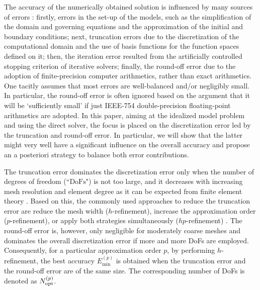 \documentclass[final,3p]{elsarticle}
\begin{document}
The accuracy of the numerically obtained solution is influenced by many sources of errors \citep{ferziger2012computational}: firstly, errors in the set-up of the models, such as the simplification of the domain and governing equations and the approximation of the initial and boundary conditions; next, truncation errors due to the discretization of the computational domain and the use of basis functions for the function spaces defined on it; then, the iteration error resulted from the artificially controlled stopping criterion of iterative solvers; finally, the round-off error due to the adoption of finite-precision computer arithmetics, rather than exact arithmetics.
One tacitly assumes that most errors are well-balanced and/or negligibly small.
In particular, the round-off error is often ignored based on the argument that it will be `sufficiently small' if just IEEE-754 double-precision floating-point arithmetics \citep{zuras2008ieee} are adopted.
In this paper, aiming at the idealized model problem and using the direct solver, the focus is placed on the {discretization error} led by the truncation and round-off error. In particular, we will show that the latter might very well have a significant influence on the overall accuracy and propose an a posteriori strategy to balance both error contributions.


The truncation error dominates the discretization error only when the number of degrees of freedom (``$\text{DoFs}$") is not too large, and it decreases with increasing mesh resolution and element degree as it can be expected from finite element theory \citep{gockenbach2006understanding}. Based on this, the commonly used approaches to reduce the truncation error are reduce the mesh width ($h$-refinement), increase the approximation order ($p$-refinement), or apply both strategies simultaneously ($hp$-refinement) \citep{guo1986hp}. 
The round-off error is, however, only negligible for moderately coarse meshes and dominates the overall discretization error if more and more DoFs are employed. 
Consequently, for a particular approximation order $p$, by performing $h$-refinement, the best accuracy ${E}_{\text{min}}^{(p)}$ is obtained when the truncation error and the round-off error are of the same size. The corresponding number of DoFs is denoted as $N_{\rm opt}^{(p)}$.
\end{document}
